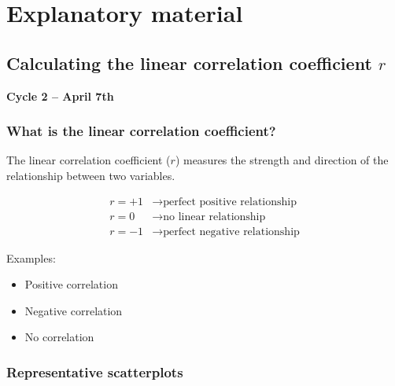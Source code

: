 \documentclass[12pt]{article}
\begin{document}
	
	\section{Explanatory material}
	
	\subsection{Calculating the linear correlation coefficient $r$}
	\textbf{Cycle 2 -- April 7th}
	
	\subsubsection*{What is the linear correlation coefficient?}
	
	The linear correlation coefficient ($r$) measures the strength and direction of the relationship between two variables.
	
	\[
	\begin{aligned}
		r=+1 &\rightarrow \text{perfect positive relationship} \\
		r=0  &\rightarrow \text{no linear relationship} \\
		r=-1 &\rightarrow \text{perfect negative relationship}
	\end{aligned}
	\]
	
	Examples:
	\begin{itemize}
		\item Positive correlation
		\item Negative correlation
		\item No correlation
	\end{itemize}
	
	\subsubsection*{Representative scatterplots}
	
\end{document}
